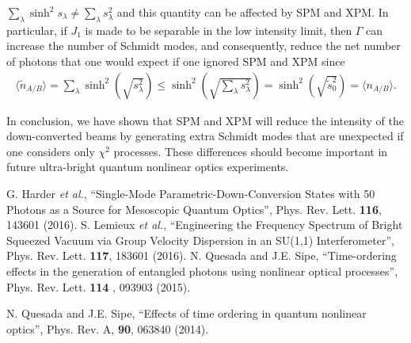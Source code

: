 \documentclass[letterpaper,10pt]{article}
\newcommand{\ea}{\emph{et al.}}
\newcommand{\braket}[1]{\langle #1 \rangle}
\newcommand{\eq}[1]{\begin{align}#1\end{align}}
\begin{document}
$\sum_\lambda \sinh^2 s_\lambda \neq \sum_\lambda s_\lambda^2$
and this quantity can be affected by SPM and XPM. In particular, if $J_1$ is made to be separable in the low intensity limit, then $\Gamma$ can increase the number of Schmidt modes, and consequently, reduce the net number of photons that one would expect if one ignored SPM and XPM since
\eq{
\braket{\tilde n_{A/B}}=\sum_{\lambda} \sinh^2\left( \sqrt{s_\lambda^2} \right) \leq  \sinh^2 \left( \sqrt{ \sum_{\lambda} s_\lambda^2}\right) =\sinh^2 \left( \sqrt{ \tilde s_0^2}\right)=\braket{n_{A/B}}.
}

In conclusion, we have shown that SPM and XPM will reduce the intensity of the down-converted beams by generating extra Schmidt modes that are unexpected if one considers only $\chi^2$ processes. These differences should become important in future ultra-bright quantum nonlinear optics experiments.
\begin{thebibliography}{99}
 G. Harder \ea, ``Single-Mode Parametric-Down-Conversion States with 50 Photons as a Source for Mesoscopic Quantum Optics'', Phys. Rev. Lett. {\bf 116}, 143601 (2016).
 S. Lemieux \ea, ``Engineering the Frequency Spectrum of Bright Squeezed Vacuum via Group Velocity Dispersion in an SU(1,1) Interferometer'', Phys. Rev. Lett. {\bf 117}, 183601 (2016).
 N. Quesada and J.E. Sipe, ``Time-ordering effects in the generation of entangled photons using nonlinear optical processes'', Phys. Rev. Lett. {\bf 114} , 093903 (2015).

 N. Quesada and J.E. Sipe, ``Effects of time ordering in quantum nonlinear optics'', Phys. Rev. A, {\bf 90}, 063840 (2014).

\end{thebibliography}
\end{document}
